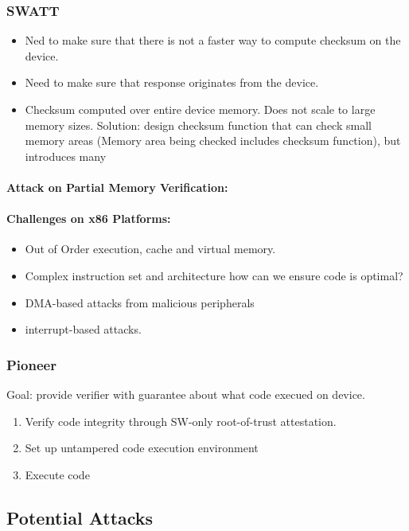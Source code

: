 \subsubsection{SWATT}
\begin{itemize}
    \item Ned to make sure that there is not a faster way to compute checksum on the device.
    \item Need to make sure that response originates from the device.
    \item Checksum computed over entire device memory. Does not scale to large memory sizes.
    Solution: design checksum function that can check small memory areas (Memory area being checked includes checksum function), but introduces many
\end{itemize}{}

\paragraph{Attack on Partial Memory Verification: }

\paragraph{Challenges on x86 Platforms:}
\begin{itemize}
    \item Out of Order execution, cache and virtual memory.
    \item Complex instruction set and architecture how can we ensure code is optimal?
    \item DMA-based attacks from malicious peripherals
    \item interrupt-based attacks.
\end{itemize}{}

\subsubsection{Pioneer}
Goal: provide verifier with guarantee about what code execued on device.
\begin{enumerate}
    \item Verify code integrity through SW-only root-of-trust attestation.
    \item Set up untampered code execution environment
    \item Execute code
\end{enumerate}{}

\subsection{Potential Attacks}

